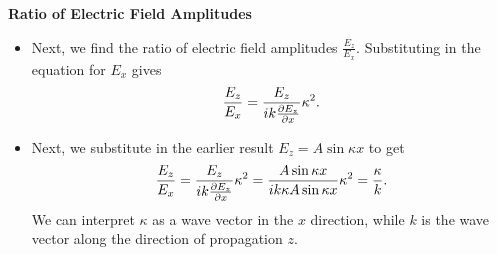 \documentclass[11pt, a4paper]{article}
\renewcommand{\vec}[1]{\bm{#1}} %
\newcommand{\E}{\vec{E}}  %
\begin{document}
\textbf{Ratio of Electric Field Amplitudes}
\begin{itemize}
	\item Next, we find the ratio of electric field amplitudes $ \frac{E_{z}}{E_{x}} $. Substituting in the equation for $ E_{x} $ gives
	\begin{equation*}
		\frac{E_{z}}{E_{x}} = \frac{E_{z}}{ik\pdv{E_{z}}{x}} \kappa^{2}.
	\end{equation*}
	
	
	\item Next, we substitute in the earlier result $ E_{z} = A \sin \kappa x $ to get
	\begin{equation*}
		\frac{E_{z}}{E_{x}} = \frac{E_{z}}{ik\pdv{E_{z}}{x}} \kappa^{2} = \frac{A \sin \kappa x}{ik\kappa A \sin \kappa x} \kappa^{2} = \frac{\kappa}{k}.
	\end{equation*}
	We can interpret $ \kappa $ as a wave vector in the $ x $ direction, while $ k $ is the wave vector along the direction of propagation $ z $. 
	
\end{itemize}
\end{document}

